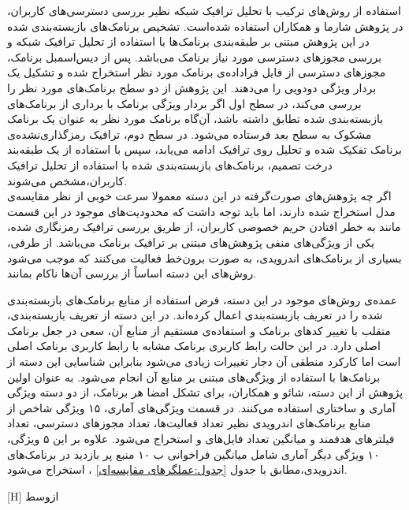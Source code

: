 استفاده از روش‌های ترکیب با تحلیل ترافیک شبکه نظیر بررسی دسترسی‌های کاربران، در پژوهش شارما و همکاران استفاده شده‌است. تشخیص برنامک‌های بازبسته‌بندی شده در این پژوهش مبتنی بر طبقه‌بندی برنامک‌ها با استفاده از تحلیل ترافیک شبکه و بررسی مجوز‌های دسترسی مورد نیاز برنامک می‌باشد. پس از دیس‌اسمبل برنامک، مجوز‌های دسترسی از فایل فراداده‌ی‌ برنامک مورد نظر استخراج شده و تشکیل یک بردار ویژگی دودویی را می‌دهند. این پژوهش از دو سطح برنامک‌های مورد نظر را بررسی می‌کند، در سطح اول اگر بردار ویژگی برنامک با برداری از برنامک‌های بازبسته‌بندی شده تطابق داشته باشد، آن‌گاه برنامک مورد نظر به عنوان یک برنامک مشکوک به سطح بعد فرستاده می‌شود. در سطح دوم، ترافیک رمزگذاری‌نشده‌‌ی برنامک تفکیک شده و تحلیل روی ترافیک  ادامه می‌یابد، سپس با استفاده از یک طبقه‌بند درخت تصمیم‌، برنامک‌های بازبسته‌بندی شده با استفاده از تحلیل ترافیک کاربران،‌مشخص می‌شوند.\\
اگر چه پژوهش‌های صورت‌گرفته در این دسته معمولا سرعت خوبی از نظر مقایسه‌ی مدل استخراج شده‌ دارند، اما باید توجه داشت که محدودیت‌های موجود در این قسمت مانند به خطر افتادن حریم خصوصی کاربران، از طریق بررسی ترافیک رمز‌نگاری شده، یکی از ویژگی‌های منفی پژوهش‌های مبتنی بر ترافیک برنامک می‌باشد. از طرفی، بسیاری از برنامک‌های اندرویدی، به صورت برون‌خط فعالیت می‌کنند که موجب می‌شود روش‌های این دسته اساساً از بررسی آن‌ها ناکام بمانند.


عمده‌ی روش‌های موجود در این دسته، فرض استفاده از منابع برنامک‌های بازبسته‌بندی شده را در تعریف بازبسته‌بندی اعمال کرده‌اند. در این دسته از تعریف بازبسته‌بندی، متقلب با تغییر کد‌های برنامک و استفاده‌ی مستقیم از منابع آن، سعی در جعل برنامک اصلی دارد. در این حالت رابط کاربری برنامک مشابه با رابط کاربری برنامک اصلی است اما کارکرد منطقی آن دجار تغییرات زیادی می‌شود بنابراین شناسایی این دسته از برنامک‌ها با استفاده از ویژگی‌های مبتنی بر منابع آن انجام می‌شود. به عنوان اولین پژوهش از این دسته، شائو و همکاران، برای تشکل امضا هر برنامک، از دو دسته ویژگی آماری‌ و ساختاری‌ استفاده می‌کنند. در قسمت ویژگی‌های آماری، ۱۵ ویژگی شاخص از منابع برنامک‌های اندرویدی نظیر تعداد فعالیت‌ها‌، تعداد مجوز‌های دسترسی، تعداد فیلتر‌های هدفمند‌ و میانگین تعداد فایل‌های  و  استخراج می‌شود. علاوه بر این ۵ ویژگی، ۱۰ ویژگی دیگر آماری شامل میانگین فراخوانی ب ۱۰ منبع پر بازدید در برنامک‌های اندرویدی،مطابق با جدول
\ref{جدول:عملگرهای مقایسه‌ای}
، استخراج می‌شود.

[H]
‌ازوسط

